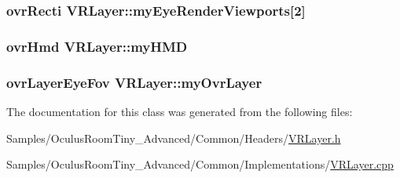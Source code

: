 \subsubsection[{\texorpdfstring{my\+Eye\+Render\+Viewports}{myEyeRenderViewports}}]{\setlength{\rightskip}{0pt plus 5cm}ovr\+Recti V\+R\+Layer\+::my\+Eye\+Render\+Viewports\mbox{[}2\mbox{]}\hspace{0.3cm}{\ttfamily [protected]}}\hypertarget{class_v_r_layer_ab79ac408b474f49eb0ec4fb5603752ff}{}\label{class_v_r_layer_ab79ac408b474f49eb0ec4fb5603752ff}
\subsubsection[{\texorpdfstring{my\+H\+MD}{myHMD}}]{\setlength{\rightskip}{0pt plus 5cm}ovr\+Hmd V\+R\+Layer\+::my\+H\+MD\hspace{0.3cm}{\ttfamily [protected]}}\hypertarget{class_v_r_layer_ab7dbb8c74485a7546bd77f6817e76da2}{}\label{class_v_r_layer_ab7dbb8c74485a7546bd77f6817e76da2}
\subsubsection[{\texorpdfstring{my\+Ovr\+Layer}{myOvrLayer}}]{\setlength{\rightskip}{0pt plus 5cm}ovr\+Layer\+Eye\+Fov V\+R\+Layer\+::my\+Ovr\+Layer\hspace{0.3cm}{\ttfamily [protected]}}\hypertarget{class_v_r_layer_a427baf6b2cb1ef51254fd83d0c9179f8}{}\label{class_v_r_layer_a427baf6b2cb1ef51254fd83d0c9179f8}


The documentation for this class was generated from the following files\+:\begin{DoxyCompactItemize}
\item 
Samples/\+Oculus\+Room\+Tiny\+\_\+\+Advanced/\+Common/\+Headers/\hyperlink{_v_r_layer_8h}{V\+R\+Layer.\+h}\item 
Samples/\+Oculus\+Room\+Tiny\+\_\+\+Advanced/\+Common/\+Implementations/\hyperlink{_v_r_layer_8cpp}{V\+R\+Layer.\+cpp}\end{DoxyCompactItemize}
